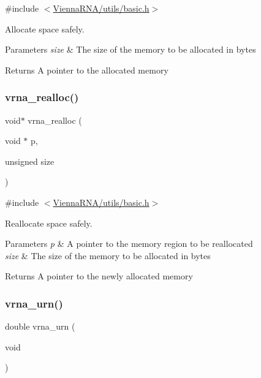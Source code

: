 {\ttfamily \#include $<$\hyperlink{utils_2basic_8h}{Vienna\+R\+N\+A/utils/basic.\+h}$>$}



Allocate space safely. 


\begin{DoxyParams}{Parameters}
{\em size} & The size of the memory to be allocated in bytes \\
\hline
\end{DoxyParams}
\begin{DoxyReturn}{Returns}
A pointer to the allocated memory 
\end{DoxyReturn}
\mbox{\label{group__utils_ga27f4719a66c6f90d1cca3d1e6e696c6a}} 
\subsubsection{\texorpdfstring{vrna\+\_\+realloc()}{vrna\_realloc()}}
{\footnotesize\ttfamily void$\ast$ vrna\+\_\+realloc (\begin{DoxyParamCaption}\item[{void $\ast$}]{p,  }\item[{unsigned}]{size }\end{DoxyParamCaption})}



{\ttfamily \#include $<$\hyperlink{utils_2basic_8h}{Vienna\+R\+N\+A/utils/basic.\+h}$>$}



Reallocate space safely. 


\begin{DoxyParams}{Parameters}
{\em p} & A pointer to the memory region to be reallocated \\
\hline
{\em size} & The size of the memory to be allocated in bytes \\
\hline
\end{DoxyParams}
\begin{DoxyReturn}{Returns}
A pointer to the newly allocated memory 
\end{DoxyReturn}
\mbox{\label{group__utils_ga384e256ebb295d04a14426179db0dd6e}} 
\subsubsection{\texorpdfstring{vrna\+\_\+urn()}{vrna\_urn()}}
{\footnotesize\ttfamily double vrna\+\_\+urn (\begin{DoxyParamCaption}\item[{void}]{ }\end{DoxyParamCaption})}



